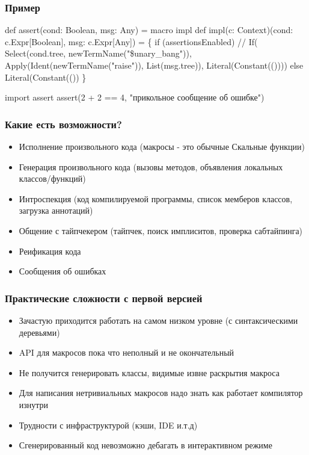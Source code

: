 \documentclass[svgnames,hyperref={bookmarks=false}]{beamer}
\begin{document}
\begin{frame}[fragile]
\frametitle{Пример}
\begin{semiverbatim}
def assert(cond: Boolean, msg: Any) = macro impl
def impl(c: Context)(cond: c.Expr[Boolean], msg: c.Expr[Any]) = \{
  if (assertionsEnabled)
    // 
    If(
      Select(cond.tree, newTermName("\$unary_bang")),
      Apply(Ident(newTermName("raise")), List(msg.tree)),
      Literal(Constant(())))
  else
    Literal(Constant(())
\}

import assert
assert(2 + 2 == 4, "прикольное сообщение об ошибке")
\end{semiverbatim}
\end{frame}

\begin{frame}[fragile]
\frametitle{Какие есть возможности?}

\begin{itemize}
\item Исполнение произвольного кода (макросы - это обычные Скальные функции)
\item Генерация произвольного кода (вызовы методов, объявления локальных классов/функций)
\item Интроспекция (код компилируемой программы, список мемберов классов, загрузка аннотаций)
\item Общение с тайпчекером (тайпчек, поиск имплиситов, проверка сабтайпинга)
\item Реификация кода
\item Сообщения об ошибках
\end{itemize}
\end{frame}

\begin{frame}[fragile]
\frametitle{Практические сложности с первой версией}

\begin{itemize}
\item Зачастую приходится работать на самом низком уровне (с синтаксическими деревьями)
\item API для макросов пока что неполный и не окончательный
\item Не получится генерировать классы, видимые извне раскрытия макроса
\item Для написания нетривиальных макросов надо знать как работает компилятор изнутри
\item Трудности с инфраструктурой (кэши, IDE и.т.д)
\item Сгенерированный код невозможно дебагать в интерактивном режиме
\end{itemize}
\end{frame}
\end{document}
